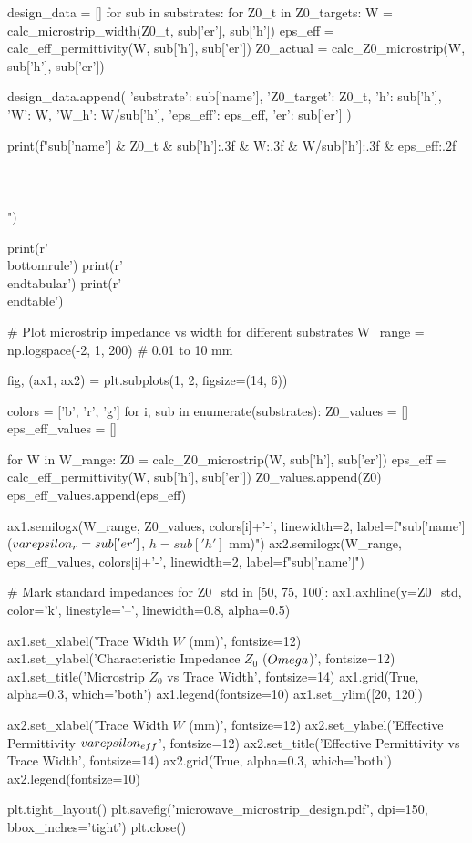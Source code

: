 \documentclass[11pt,a4paper]{article}
\begin{document}
\begin{pycode}
design_data = []
for sub in substrates:
    for Z0_t in Z0_targets:
        W = calc_microstrip_width(Z0_t, sub['er'], sub['h'])
        eps_eff = calc_eff_permittivity(W, sub['h'], sub['er'])
        Z0_actual = calc_Z0_microstrip(W, sub['h'], sub['er'])

        design_data.append({
            'substrate': sub['name'],
            'Z0_target': Z0_t,
            'h': sub['h'],
            'W': W,
            'W_h': W/sub['h'],
            'eps_eff': eps_eff,
            'er': sub['er']
        })

        print(f"{sub['name']} & {Z0_t} & {sub['h']:.3f} & {W:.3f} & {W/sub['h']:.3f} & {eps_eff:.2f} \\\\\\\\")

print(r'\\bottomrule')
print(r'\\end{tabular}')
print(r'\\end{table}')

# Plot microstrip impedance vs width for different substrates
W_range = np.logspace(-2, 1, 200)  # 0.01 to 10 mm

fig, (ax1, ax2) = plt.subplots(1, 2, figsize=(14, 6))

colors = ['b', 'r', 'g']
for i, sub in enumerate(substrates):
    Z0_values = []
    eps_eff_values = []

    for W in W_range:
        Z0 = calc_Z0_microstrip(W, sub['h'], sub['er'])
        eps_eff = calc_eff_permittivity(W, sub['h'], sub['er'])
        Z0_values.append(Z0)
        eps_eff_values.append(eps_eff)

    ax1.semilogx(W_range, Z0_values, colors[i]+'-', linewidth=2,
                 label=f"{sub['name']} ($\\varepsilon_r={sub['er']}$, $h={sub['h']}$ mm)")
    ax2.semilogx(W_range, eps_eff_values, colors[i]+'-', linewidth=2,
                 label=f"{sub['name']}")

# Mark standard impedances
for Z0_std in [50, 75, 100]:
    ax1.axhline(y=Z0_std, color='k', linestyle='--', linewidth=0.8, alpha=0.5)

ax1.set_xlabel('Trace Width $W$ (mm)', fontsize=12)
ax1.set_ylabel('Characteristic Impedance $Z_0$ ($\\Omega$)', fontsize=12)
ax1.set_title('Microstrip $Z_0$ vs Trace Width', fontsize=14)
ax1.grid(True, alpha=0.3, which='both')
ax1.legend(fontsize=10)
ax1.set_ylim([20, 120])

ax2.set_xlabel('Trace Width $W$ (mm)', fontsize=12)
ax2.set_ylabel('Effective Permittivity $\\varepsilon_{eff}$', fontsize=12)
ax2.set_title('Effective Permittivity vs Trace Width', fontsize=14)
ax2.grid(True, alpha=0.3, which='both')
ax2.legend(fontsize=10)

plt.tight_layout()
plt.savefig('microwave_microstrip_design.pdf', dpi=150, bbox_inches='tight')
plt.close()
\end{pycode}
\end{document}
